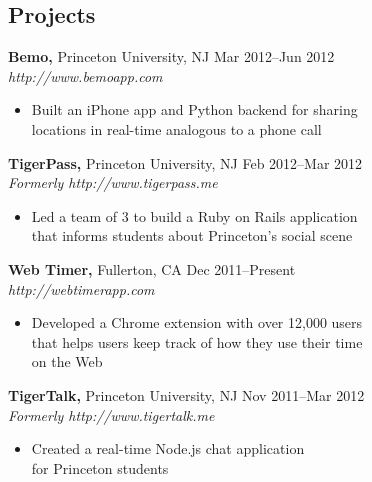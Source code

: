 \documentclass[margin]{res}
\begin{document}
\begin{resume}

\section{Projects}
 {\bf Bemo,} Princeton University, NJ \hfill Mar 2012--Jun 2012 \\
 {\it http://www.bemoapp.com}
 \begin{itemize} \itemsep -2pt  %
 \item Built an iPhone app and Python backend for sharing \\
   locations in real-time analogous to a phone call
 \end{itemize}

 {\bf TigerPass,} Princeton University, NJ \hfill Feb 2012--Mar 2012 \\
 {\it Formerly http://www.tigerpass.me}
 \begin{itemize} \itemsep -2pt  %
 \item Led a team of 3 to build a Ruby on Rails application \\
   that informs students about Princeton's social scene
 \end{itemize}

 {\bf Web Timer,} Fullerton, CA \hfill Dec 2011--Present \\
 {\it http://webtimerapp.com}
 \begin{itemize} \itemsep -2pt  %
 \item Developed a Chrome extension with over 12,000 users \\
   that helps users keep track of how they use their time \\
   on the Web
 \end{itemize}

 {\bf TigerTalk,} Princeton University, NJ \hfill Nov 2011--Mar 2012 \\
 {\it Formerly http://www.tigertalk.me}
 \begin{itemize} \itemsep -2pt  %
 \item Created a real-time Node.js chat application \\
   for Princeton students
 \end{itemize}


\end{resume}
\end{document}
